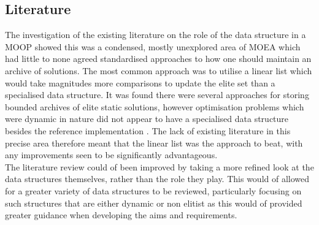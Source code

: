\documentclass{ecmm427_assignment}
\begin{document}
\subsection{Literature}
The investigation of the existing literature on the role of the data structure in a MOOP showed this was a condensed, mostly unexplored area of MOEA which had little to none agreed standardised approaches to how one should maintain an archive of solutions. The most common approach was to utilise a linear list which would take magnitudes more comparisons to update the elite set than a specialised data structure. It was found there were several approaches for storing bounded archives of elite static solutions, however optimisation problems which were dynamic in nature did not appear to have a specialised data structure besides the reference implementation \cite{Fieldsend2014}. The lack of existing literature in this precise area therefore meant that the linear list was the approach to beat, with any improvements seen to be significantly advantageous.\\
The literature review could of been improved by taking a more refined look at the data structures themselves, rather than the role they play. This would of allowed for a greater variety of data structures to be reviewed, particularly focusing on such structures that are either dynamic or non elitist as this would of provided greater guidance when developing the aims and requirements.
\end{document}
